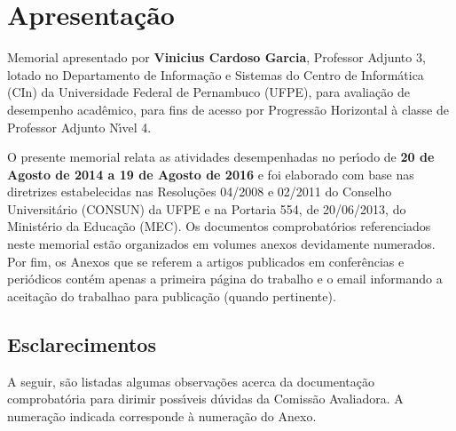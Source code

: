 \documentclass[a4paper,oneside,10pt]{article}
\newcounter{document}%
\begin{document}

\newpage
\section*{Apresenta\c{c}\~{a}o}
\vspace{0.3cm}

\begin{onehalfspace}

Memorial apresentado por \textbf{Vinicius Cardoso Garcia}, Professor Adjunto 3, lotado no Departamento de Informa\c{c}\~{a}o e Sistemas do Centro de Inform\'{a}tica (CIn) da Universidade Federal de Pernambuco (UFPE), para avalia\c{c}\~{a}o de desempenho acad\^{e}mico, para fins de acesso por Progress\~{a}o Horizontal \`{a} classe de Professor Adjunto N\'{\i}vel 4.

O presente memorial relata as atividades desempenhadas no per\'{\i}odo de \textbf{20 de Agosto de 2014 a 19 de Agosto de 2016} e foi elaborado com base nas diretrizes estabelecidas nas Resolu\c{c}\~{o}es 04/2008 e 02/2011 do Conselho Universit\'{a}rio (CONSUN) da UFPE e na Portaria 554, de 20/06/2013, do Minist\'{e}rio da Educa\c{c}\~{a}o (MEC). Os documentos comprobat\'{o}rios referenciados neste memorial est\~{a}o organizados em volumes anexos devidamente numerados. Por fim, os Anexos que se referem a artigos publicados em confer\^{e}ncias e peri\'{o}dicos cont\'{e}m apenas a primeira p\'{a}gina do trabalho e o email informando a aceita\c{c}\~{a}o do trabalhao para publica\c{c}\~{a}o (quando pertinente).

\end{onehalfspace}

\subsection*{Esclarecimentos}

A seguir, s\~{a}o listadas algumas observa\c{c}\~{o}es acerca da documenta\c{c}\~{a}o comprobat\'{o}ria para dirimir poss\'{\i}veis d\'{u}vidas da Comiss\~{a}o Avaliadora. A numera\c{c}\~{a}o indicada corresponde \`{a} numera\c{c}\~{a}o do Anexo.
\end{document}
